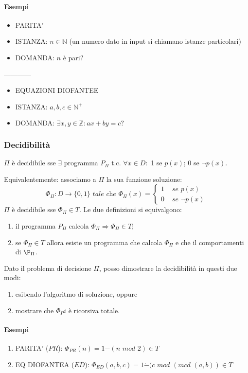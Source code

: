\documentclass{article}
\begin{document}
\paragraph{Esempi}

\begin{itemize}
	\item PARITA'
	\item ISTANZA: $n \in \mathbb{N}$ (un numero dato in input si chiamano istanze particolari)
	\item DOMANDA: $n$ è pari?
\end{itemize}




------------



\begin{itemize}
	\item EQUAZIONI DIOFANTEE
	\item ISTANZA: $a,b,c \in \mathbb{N}^+$
	\item DOMANDA: $\exists x,y \in \mathbb{Z}:ax+by=c$?
\end{itemize}

\subsubsection{Decidibilità}
$\Pi$ è decidibile sse $\exists$ programma $P_{\Pi}$ t.c. $\forall x \in D:$ 1 se $p(x)$; 0 se $\neg p(x)$.



Equivalentemente: associamo a $\Pi$ la sua funzione soluzione:
\begin{displaymath}
	\Phi_\Pi: D \rightarrow \{0,1\}\textit{ tale che }\Phi_\Pi(x)=
	\begin{cases}
		1 &\textit{ se } p(x) \\
		0 &\textit{ se } \neg p(x) 
	\end{cases}
\end{displaymath}
$\Pi$ è decidibile sse $\Phi_\Pi \in T$.
Le due definizioni si equivalgono:
\begin{enumerate}
	\item il programma $P_\Pi$ calcola $\Phi_\Pi \Rightarrow \Phi_\Pi \in T$;
	\item se $\Phi_\Pi \in T$ allora esiste un programma che calcola $\Phi_\Pi$ e che il comportamenti di $\P_\Pi$.
\end{enumerate}




Dato il problema di decisione $\Pi$, posso dimostrare la decidibilità in questi due modi:
\begin{enumerate}
	\item esibendo l'algoritmo di soluzione, oppure
	\item mostrare che $\Phi_Pi$ è ricorsiva totale.
\end{enumerate}
\paragraph{Esempi}
\begin{enumerate}
	\item PARITA' ($PR$): $\Phi_{PR}(n) = 1 \dot{-} (n \textit{ mod }2) \in T$
	\item EQ DIOFANTEA ($ED$): $\Phi_{ED}(a,b,c) = 1 \dot{-} (c \textit{ mod }(\textit{mcd }(a,b)) \in T$
\end{enumerate}
\end{document}
